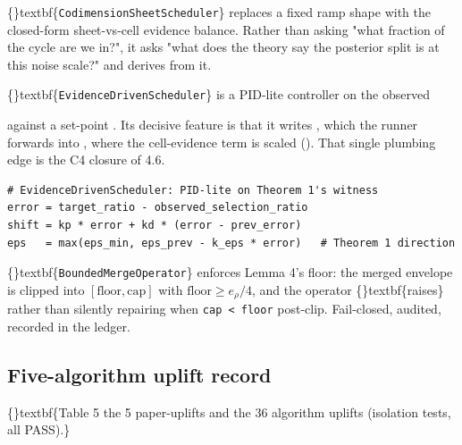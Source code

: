\documentclass{article}
\begin{document}
\{\}textbf\{\texttt{CodimensionSheetScheduler}\} replaces a fixed ramp shape with the closed-form sheet-vs-cell evidence balance. Rather than asking "what fraction of the cycle are we in?", it asks "what does the theory say the posterior split is at this noise scale?" and derives  from it.

\{\}textbf\{\texttt{EvidenceDrivenScheduler}\} is a PID-lite controller on the observed

 against a set-point . Its decisive feature is that it writes , which the runner forwards into , where the cell-evidence term is scaled (). That single plumbing edge is the C4 closure of 4.6.

\begin{verbatim}
# EvidenceDrivenScheduler: PID-lite on Theorem 1's witness
error = target_ratio - observed_selection_ratio
shift = kp * error + kd * (error - prev_error)
eps   = max(eps_min, eps_prev - k_eps * error)   # Theorem 1 direction
\end{verbatim}
\{\}textbf\{\texttt{BoundedMergeOperator}\} enforces Lemma 4's floor: the merged envelope is clipped into $[\text{floor}, \text{cap}]$ with $\text{floor} \ge e_\rho/4$, and the operator \{\}textbf\{raises\} rather than silently repairing when \texttt{cap < floor} post-clip. Fail-closed, audited, recorded in the ledger.

\subsection{Five-algorithm uplift record}
\{\}textbf\{Table 5  the 5 paper-uplifts and the 36 algorithm uplifts (isolation tests, all PASS).\}
\end{document}
